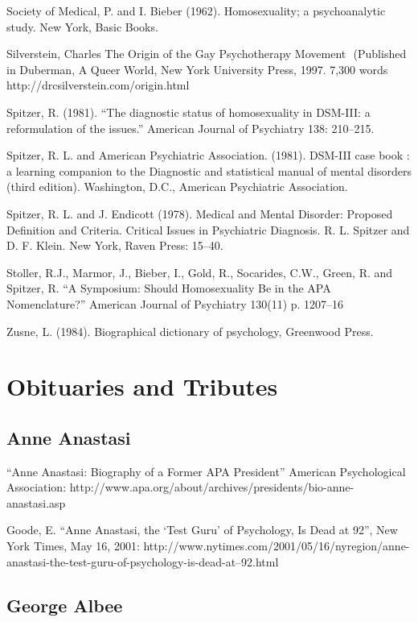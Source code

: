 \begin{refsection}
\begin{appendices}
Society of Medical, P. and I. Bieber (1962). Homosexuality; a psychoanalytic study. New York, Basic Books.

Silverstein, Charles The Origin of the Gay Psychotherapy Movement
 (Published in Duberman, A Queer World, New York University Press, 1997. 7,300 words http:\slash \slash drcsilverstein.com\slash origin.html

Spitzer, R. (1981). ``The diagnostic status of homosexuality in DSM-III: a reformulation of the issues.'' American Journal of Psychiatry 138: 210--215.

Spitzer, R. L. and American Psychiatric Association. (1981). DSM-III case book : a learning companion to the Diagnostic and statistical manual of mental disorders (third edition). Washington, D.C., American Psychiatric Association.

Spitzer, R. L. and J. Endicott (1978). Medical and Mental Disorder: Proposed Definition and Criteria. Critical Issues in Psychiatric Diagnosis. R. L. Spitzer and D. F. Klein. New York, Raven Press: 15--40.

Stoller, R.J., Marmor, J., Bieber, I., Gold, R., Socarides, C.W., Green, R. and Spitzer, R. ``A Symposium: Should Homosexuality Be in the APA Nomenclature?'' American Journal of Psychiatry 130(11) p. 1207--16

Zusne, L. (1984). Biographical dictionary of psychology, Greenwood Press.

\section{Obituaries and Tributes}
\label{obituariesandtributes}

\subsection{Anne Anastasi}
\label{anneanastasi}

``Anne Anastasi: Biography of a Former APA President'' American Psychological Association: http:\slash \slash www.apa.org\slash about\slash archives\slash presidents\slash bio-anne-anastasi.asp

Goode, E. ``Anne Anastasi, the `Test Guru' of Psychology, Is Dead at 92'', New York Times, May 16, 2001: http:\slash \slash www.nytimes.com\slash 2001\slash 05\slash 16\slash nyregion\slash anne-anastasi-the-test-guru-of-psychology-is-dead-at--92.html 

\subsection{George Albee}
\label{georgealbee}


\end{appendices}
\end{refsection}
